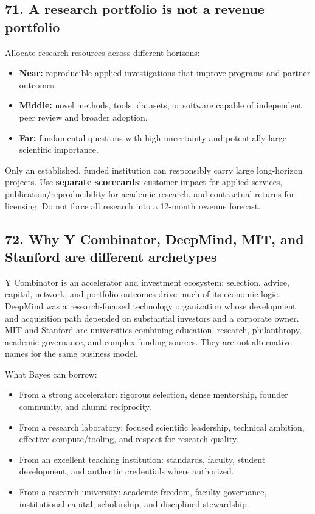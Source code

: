 \subsection{71. A research portfolio is not a revenue portfolio}

Allocate research resources across different horizons:

\begin{itemize}[leftmargin=*,itemsep=1.5pt]
  \item \textbf{Near:} reproducible applied investigations that improve programs and partner outcomes.
  \item \textbf{Middle:} novel methods, tools, datasets, or software capable of independent peer review and broader adoption.
  \item \textbf{Far:} fundamental questions with high uncertainty and potentially large scientific importance.
\end{itemize}

Only an established, funded institution can responsibly carry large long-horizon projects. Use \textbf{separate scorecards}: customer impact for applied services, publication/\allowbreak reproducibility for academic research, and contractual returns for licensing. Do not force all research into a 12-month revenue forecast.

\subsection{72. Why Y Combinator, DeepMind, MIT, and Stanford are different archetypes}

Y Combinator is an accelerator and investment ecosystem: selection, advice, capital, network, and portfolio outcomes drive much of its economic logic. DeepMind was a research-focused technology organization whose development and acquisition path depended on substantial investors and a corporate owner. MIT and Stanford are universities combining education, research, philanthropy, academic governance, and complex funding sources. They are not alternative names for the same business model.

What Bayes can borrow:

\begin{itemize}[leftmargin=*,itemsep=1.5pt]
  \item From a strong accelerator: rigorous selection, dense mentorship, founder community, and alumni reciprocity.
  \item From a research laboratory: focused scientific leadership, technical ambition, effective compute/\allowbreak tooling, and respect for research quality.
  \item From an excellent teaching institution: standards, faculty, student development, and authentic credentials where authorized.
  \item From a research university: academic freedom, faculty governance, institutional capital, scholarship, and disciplined stewardship.
\end{itemize}


